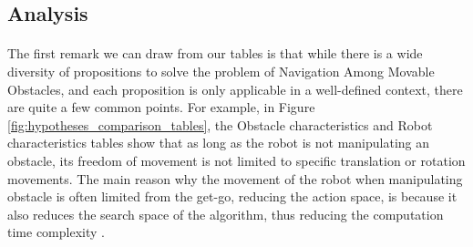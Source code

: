\subsection{Analysis}

\paragraph{} The first remark we can draw from our tables is that while there is a wide diversity of propositions to solve the problem of Navigation Among Movable Obstacles, and each proposition is only applicable in a well-defined context, there are quite a few common points. For example, in Figure \ref{fig:hypotheses_comparison_tables}, the Obstacle characteristics and Robot characteristics tables show that as long as the robot is not manipulating an obstacle, its freedom of movement is not limited to specific translation or rotation movements. The main reason why the movement of the robot when manipulating obstacle is often limited from the get-go, reducing the action space, is because it also reduces the search space of the algorithm, thus reducing the computation time complexity \parencite{stilman_navigation_2005}.


